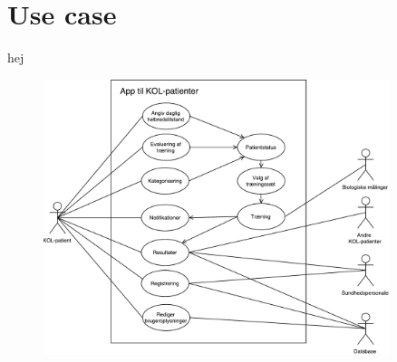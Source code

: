 \section{Use case} \label{sec:usecase}
hej 


\begin{figure} [H]
\centering
\includegraphics[width=0.9\textwidth]{figures/aktivitetsdiagram/Usecase}
\caption{}
\label{fig:usecase}
\end{figure}